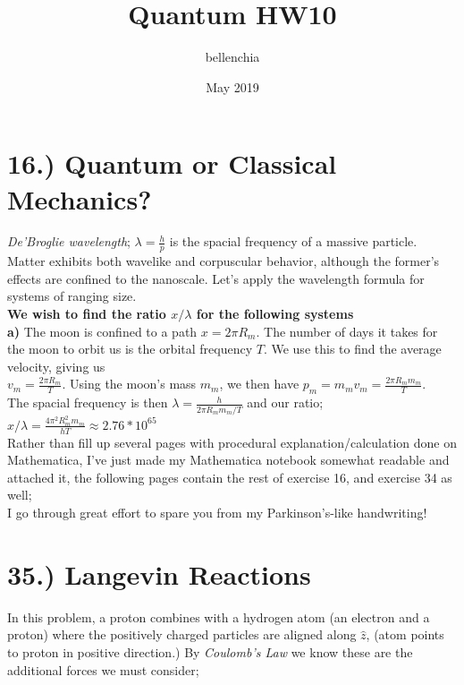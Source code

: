 \documentclass[12pt]{article}
\title{Quantum HW10}
\author{bellenchia}
\date{May 2019}
\begin{document}
\maketitle

\section*{16.) Quantum or Classical Mechanics?}\textit{De'Broglie wavelength}; $\lambda=\frac{h}{p}$ is the spacial frequency of a massive particle.\\ Matter exhibits both wavelike and corpuscular behavior, although the former's effects are confined to the nanoscale. Let's apply the wavelength formula for systems of ranging size.\\\textbf{We wish to find the ratio $x/\lambda$ for the following systems}\\

\textbf{a)}  The moon is confined to a path $x=2\pi R_m$. The number of days it takes for the moon to orbit us is the orbital frequency $T$. We use this to find the average velocity, giving us\\

$v_m=\frac{2\pi R_m}{T}$. Using the moon's mass $m_m$, we then have $p_m=m_mv_m=\frac{2\pi R_mm_m}{T}$. \\

The spacial frequency is then $\lambda=\frac{h}{2\pi R_mm_m/T}$ and our ratio;  $x/\lambda=\frac{4\pi^2R_m^2m_m}{hT}\approx2.76*10^{65}$\\

Rather than fill up several pages with procedural explanation/calculation done on Mathematica, I've just made my Mathematica notebook somewhat readable and attached it, the following pages contain the rest of exercise 16, and exercise 34 as well;\\

I go through great effort to spare you from my Parkinson's-like handwriting!


\section*{35.) Langevin Reactions}

In this problem, a proton combines with a hydrogen atom (an electron and a proton) where the positively charged particles are aligned along $\hat{z}$, (atom points to proton in positive direction.) By \textit{Coulomb's Law} we know these are the additional forces we must consider;\\
\end{document}
